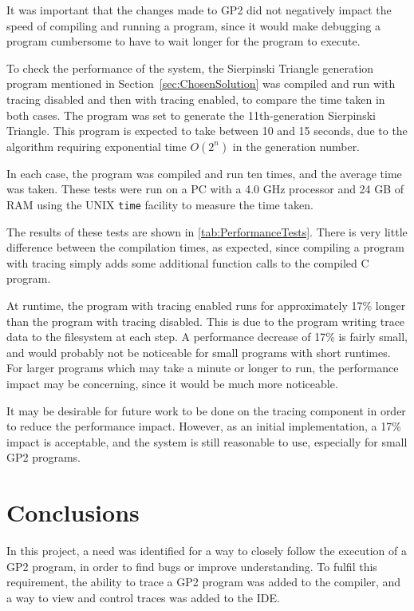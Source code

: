 \documentclass[authoryearcitations]{UoYCSproject}
\begin{document}
It was important that the changes made to GP2 did not negatively impact the speed
of compiling and running a program, since it would make debugging a program
cumbersome to have to wait longer for the program to execute.

To check the performance of the system, the Sierpinski Triangle generation
program mentioned in Section~\ref{sec:ChosenSolution} was compiled and run with
tracing disabled and then with tracing enabled, to compare the time taken in
both cases. The program was set to generate the 11th-generation Sierpinski
Triangle. This program is expected to take between 10 and 15 seconds, due to the
algorithm requiring exponential time $O(2^{n})$ in the generation number.

In each case, the program was compiled and run ten times, and the average time
was taken. These tests were run on a PC with a 4.0 GHz processor and 24 GB of RAM
using the UNIX \texttt{time} facility to measure the time taken.

The results of these tests are shown in \autoref{tab:PerformanceTests}. There
is very little difference between the compilation times, as expected, since compiling
a program with tracing simply adds some additional function calls to the compiled
C program.

At runtime, the program with tracing enabled runs for approximately 17\% longer
than the program with tracing disabled. This is due to the program writing trace
data to the filesystem at each step. A performance decrease of 17\% is fairly small,
and would probably not be noticeable for small programs with short runtimes. For
larger programs which may take a minute or longer to run, the performance impact
may be concerning, since it would be much more noticeable.

It may be desirable for future work to be done on the tracing component in order
to reduce the performance impact. However, as an initial implementation, a 17\%
impact is acceptable, and the system is still reasonable to use, especially for
small GP2 programs.

\clearpage


\chapter{Conclusions}
\label{cha:Conclusions}

In this project, a need was identified for a way to closely follow the execution
of a GP2 program, in order to find bugs or improve understanding. To fulfil this
requirement, the ability to trace a GP2 program was added to the compiler, and
a way to view and control traces was added to the IDE.
\end{document}
